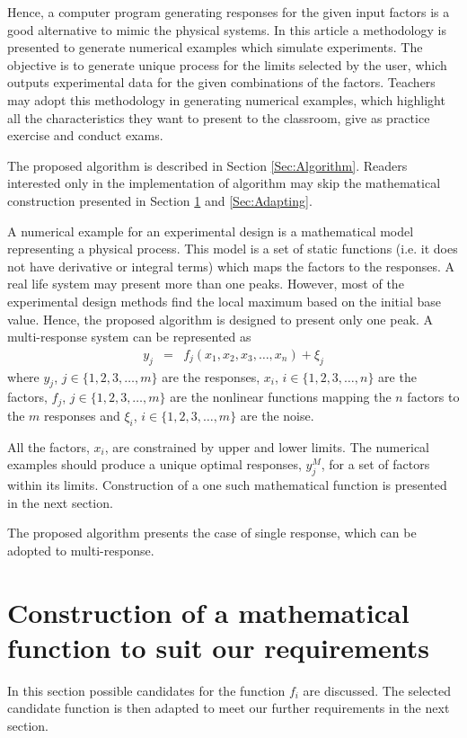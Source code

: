 \documentclass[twocolumn]{svjour3}          %
\begin{document}
Hence, a computer program generating responses for the given input factors is a good alternative to mimic the physical systems. In this article a methodology is presented to generate numerical examples which simulate experiments. The objective is to generate unique process for the limits selected by the user, which outputs experimental data for the given combinations of the factors. Teachers may adopt this methodology in generating numerical examples, which highlight all the characteristics they want to present to the classroom, give as practice exercise and conduct exams.
\par
The proposed algorithm is described in Section \ref{Sec:Algorithm}. Readers interested only in the implementation of algorithm may skip the mathematical construction presented in Section \ref{Sec:Construction} and \ref{Sec:Adapting}.
\par
A numerical example for an experimental design is a mathematical model representing a physical process. This model is a set of static functions (i.e. it does not have derivative or integral terms) which maps the factors to the responses. A real life system may present more than one peaks. However, most of the experimental design methods find the local maximum based on the initial base value. Hence, the proposed algorithm is designed to present only one peak. A multi-response system can be represented as %
\begin{eqnarray}
y_j &=& f_j(x_1, x_2, x_3, \dots, x_n) + \xi_j \label{Eqn:Function}
\end{eqnarray}
\noindent where $y_j$, $j\in \{1,2,3, \dots, m\}$ are the responses, $x_i$, $i\in \{1,2,3, \dots, n\}$ are the factors, $f_j$, $j\in \{1,2,3, \dots, m\}$ are the nonlinear functions mapping the $n$ factors to the $m$ responses and $\xi_i$, $i\in \{1,2,3, \dots, m\}$ are the noise.
\par
All the factors, $x_i$, are constrained by upper and lower limits. The numerical examples should produce a unique optimal responses, $y_j^M$, for a set of factors within its limits. Construction of a one such mathematical function is presented in the next section.
\par
The proposed algorithm presents the case of single response, which can be adopted to multi-response.
\section{Construction of a mathematical function to suit our requirements}
\label{Sec:Construction}
In this section possible candidates for the function $f_i$  are discussed. The selected candidate function is then adapted to meet our further requirements in the next section.
\end{document}
